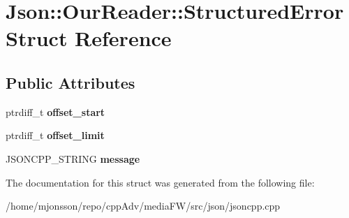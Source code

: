 \hypertarget{structJson_1_1OurReader_1_1StructuredError}{}\section{Json\+:\+:Our\+Reader\+:\+:Structured\+Error Struct Reference}
\label{structJson_1_1OurReader_1_1StructuredError}
\subsection*{Public Attributes}
\begin{DoxyCompactItemize}
\item 
\mbox{\label{structJson_1_1OurReader_1_1StructuredError_a102677698afb8177c985e72dafe72b15}} 
ptrdiff\+\_\+t {\bfseries offset\+\_\+start}
\item 
\mbox{\label{structJson_1_1OurReader_1_1StructuredError_a15491a751a39c5153af04e68b1d0abb9}} 
ptrdiff\+\_\+t {\bfseries offset\+\_\+limit}
\item 
\mbox{\label{structJson_1_1OurReader_1_1StructuredError_a9d0b9986bf765d067dfcf2f971a450d1}} 
J\+S\+O\+N\+C\+P\+P\+\_\+\+S\+T\+R\+I\+NG {\bfseries message}
\end{DoxyCompactItemize}


The documentation for this struct was generated from the following file\+:\begin{DoxyCompactItemize}
\item 
/home/mjonsson/repo/cpp\+Adv/media\+F\+W/src/json/jsoncpp.\+cpp\end{DoxyCompactItemize}
